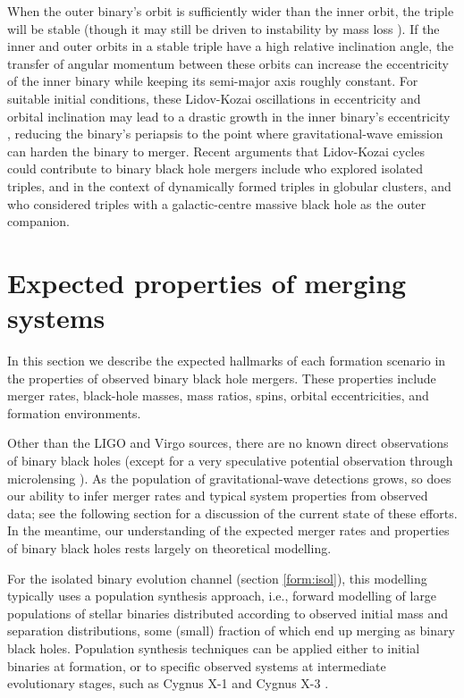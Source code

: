 \documentclass[review]{elsarticle}
\begin{document}
When the outer binary's orbit is sufficiently wider than the inner orbit, the triple will be stable (though it may still be driven to instability by mass loss \citep[e.g.,][]{PeretsKratter:2012}).  If the inner and outer orbits in a stable triple have a high relative inclination angle, the transfer of angular momentum between these orbits can increase the eccentricity of the inner binary while keeping its semi-major axis roughly constant. For suitable initial conditions, these Lidov-Kozai oscillations in eccentricity and orbital inclination \citep{Lidov:1962,Kozai:1962} may lead to a drastic growth in the inner binary's eccentricity \citep[for a review, see][]{Naoz:2016}, reducing the binary's periapsis to the point where gravitational-wave emission can harden the binary to merger.  Recent arguments that Lidov-Kozai cycles could contribute to binary black hole mergers include \citet{SilsbeeTremaine:2017} who explored isolated triples, \citet{Antonini:2016} and \citet{Martinez:2020} in the context of dynamically formed triples in globular clusters, and \citet{Hoang:2018} who considered triples with a galactic-centre massive black hole as the outer companion.


\section{Expected properties of merging systems}\label{merge}

In this section we describe the expected hallmarks of each formation scenario in the properties of observed binary black hole mergers. These properties include merger rates, black-hole masses, mass ratios, spins, orbital eccentricities, and formation environments.

Other than the LIGO and Virgo sources, there are no known direct observations of binary black holes (except for a very speculative potential observation through microlensing \citep{Dong:2007}). As the population of gravitational-wave detections grows, so does our ability to infer merger rates and typical system properties from observed data; see the following section for a discussion of the current state of these efforts. In the meantime, our understanding of the expected merger rates and properties of binary black holes rests largely on theoretical modelling. 

For the isolated binary evolution channel (section \ref{form:isol}), this modelling typically uses a population synthesis approach, i.e., forward modelling of large populations of stellar binaries distributed according to observed initial mass and separation distributions, some (small) fraction of which end up merging as binary black holes. Population synthesis techniques can be applied either to initial binaries at formation, or to specific observed systems at intermediate evolutionary stages, such as Cygnus X-1 \citep{Bulik:2008,Neijssel:2020CygX1} and Cygnus X-3 \citep{CygnusX3:2012}.  
\end{document}
